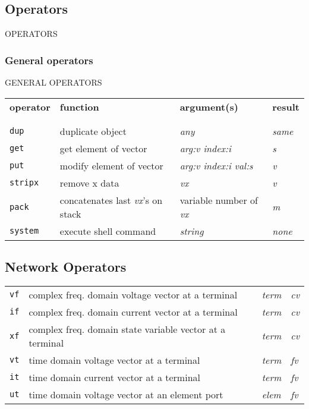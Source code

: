 \subsection{Operators}{OPERATORS}


\subsubsection{General operators}{GENERAL OPERATORS}

\begin{tabular}{p{.8in}p{2.5in}p{1.0in}p{.75in}}
{\bf operator} & {\bf function} & {\bf argument(s)} & {\bf result} \\
\\
\\
{\tt dup} & duplicate object & {\it any} & {\it same} \\
{\tt get} & get element of vector & {\it arg:v \newline index:i} & {\it s} \\
{\tt put} & modify element of vector & {\it arg:v \newline index:i \newline
  val:s} & {\it v} \\
{\tt stripx} & remove x data & {\it vx} & {\it v} \\
{\tt pack} & concatenates last {\it vx}'s on stack & variable number of {\it vx} & {\it m} \\
{\tt system} & execute shell command & {\it string} & {\it none}
\end{tabular}

\subsection[Network operators]{Network Operators}

\begin{tabular}{p{.8in}p{2.5in}p{1.0in}p{.75in}}
{\tt vf} & complex freq. domain voltage vector at a terminal & 
	{\it term} & {\it cv} \\
{\tt if} & complex freq. domain current vector at a terminal & 
	{\it term} & {\it cv} \\
{\tt xf} & complex freq. domain state variable vector at a terminal & 
	{\it term} & {\it cv} \\
{\tt vt} & time domain voltage vector at a terminal & 
	{\it term} & {\it fv} \\
{\tt it} & time domain current vector at a terminal & 
	{\it term} & {\it fv} \\
{\tt ut} & time domain voltage vector at an element port & 
	{\it elem} & {\it fv} \\
\end{tabular}

